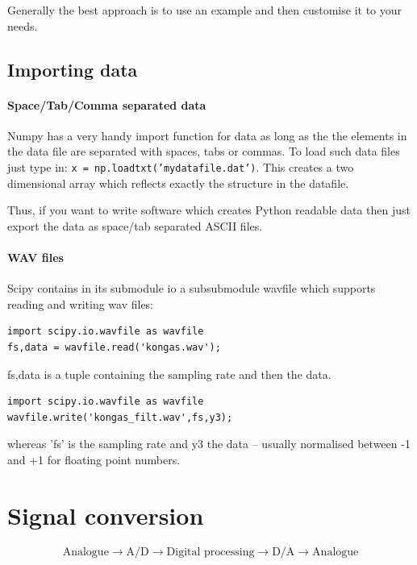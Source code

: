 \documentclass[12pt,a4paper]{article}
\begin{document}
Generally the best approach is to use an example and then customise it to your needs.




\subsection{Importing data}

\paragraph{Space/Tab/Comma separated data}
Numpy has a very handy import function for data as long as the the
elements in the data file are separated with spaces, tabs or
commas. To load such data files just type in: \texttt{x =
  np.loadtxt('mydatafile.dat')}. This creates a two dimensional array
which reflects exactly the structure in the datafile.

Thus, if you want to write software which creates Python
readable data then just export the data as space/tab separated ASCII files.



\paragraph{WAV files}
Scipy contains in its submodule io a subsubmodule wavfile which supports
reading and writing wav files:
\begin{verbatim}
import scipy.io.wavfile as wavfile
fs,data = wavfile.read('kongas.wav');
\end{verbatim}
fs,data is a tuple containing the sampling rate and then the data.

\begin{verbatim}
import scipy.io.wavfile as wavfile
wavfile.write('kongas_filt.wav',fs,y3);
\end{verbatim}
whereas 'fs' is the sampling rate and y3 the data -- usually normalised between
-1 and +1 for floating point numbers.


\clearpage


\section{Signal conversion}

\begin{equation}
\mbox{Analogue} \rightarrow \mbox{A/D} \rightarrow \mbox{Digital processing}
\rightarrow \mbox{D/A} \rightarrow \mbox{Analogue}
\end{equation}
\end{document}
